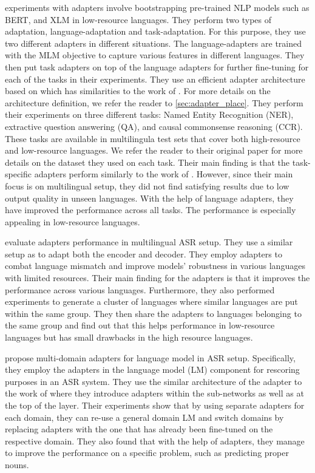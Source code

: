\cite{pfeiffer2020madx} experiments with adapters involve bootstrapping pre-trained NLP models such as BERT, and XLM \cite{conneau2019cross} in low-resource languages. They perform two types of adaptation, language-adaptation and task-adaptation. For this purpose, they use two different adapters in different situations. The language-adapters are trained with the MLM objective to capture various features in different languages. They then put task adapters on top of the language adapters for further fine-tuning for each of the tasks in their experiments. They use an efficient adapter architecture based on \cite{pfeiffer2021adapterfusion} which has similarities to the work of \cite{bapna2019simple}. For more details on the architecture definition, we refer the reader to \cref{sec:adapter_place}. They perform their experiments on three different tasks: Named Entity Recognition (NER), extractive question answering (QA), and causal commonsense reasoning (CCR). These tasks are available in multilingula test sets that cover both high-resource and low-resource languages. We refer the reader to their original paper for more details on the dataset they used on each task. Their main finding is that the task-specific adapters perform similarly to the work of \cite{houlsby2019parameter}. However, since their main focus is on multilingual setup, they did not find satisfying results due to low output quality in unseen languages. With the help of language adapters, they have improved the performance across all tasks. The performance is especially appealing in low-resource languages.

\cite{winata2020adapt} evaluate adapters performance in multilingual ASR setup. They use a similar setup as \cite{bapna2019simple} to adapt both the encoder and decoder. They employ adapters to combat language mismatch and improve models' robustness in various languages with limited resources. Their main finding for the adapters is that it improves the performance across various languages. Furthermore, they also performed experiments to generate a cluster of languages where similar languages are put within the same group. They then share the adapters to languages belonging to the same group and find out that this helps performance in low-resource languages but has small drawbacks in the high resource languages.

\cite{lee2021adaptable} propose multi-domain adapters for language model in ASR setup. Specifically, they employ the adapters in the language model (LM) component for rescoring purposes in an ASR system. They use the similar architecture of the adapter to the work of \cite{houlsby2019parameter} where they introduce adapters within the sub-networks as well as at the top of the layer. Their experiments show that by using separate adapters for each domain, they can re-use a general domain LM and switch domains by replacing adapters with the one that has already been fine-tuned on the respective domain. They also found that with the help of adapters, they manage to improve the performance on a specific problem, such as predicting proper nouns.


